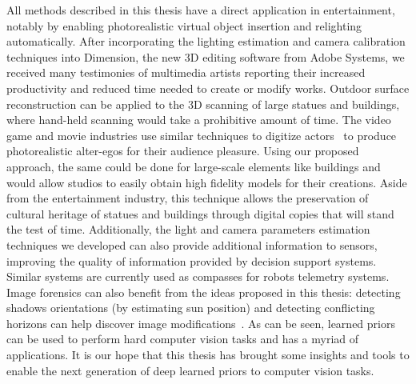 All methods described in this thesis have a direct application in entertainment, notably by enabling photorealistic virtual object insertion and relighting automatically. After incorporating the lighting estimation and camera calibration techniques into Dimension, the new 3D editing software from Adobe Systems, we received many testimonies of multimedia artists reporting their increased productivity and reduced time needed to create or modify works. Outdoor surface reconstruction can be applied to the 3D scanning of large statues and buildings, where hand-held scanning would take a prohibitive amount of time. The video game and movie industries use similar techniques to digitize actors~\cite{debevec2000acquiring} to produce photorealistic alter-egos for their audience pleasure. Using our proposed approach, the same could be done for large-scale elements like buildings and would allow studios to easily obtain high fidelity models for their creations. Aside from the entertainment industry, this technique allows the preservation of cultural heritage of statues and buildings through digital copies that will stand the test of time. Additionally, the light and camera parameters estimation techniques we developed can also provide additional information to sensors, improving the quality of information provided by decision support systems. Similar systems are currently used as compasses for robots telemetry systems\cite{Ma2017}. Image forensics can also benefit from the ideas proposed in this thesis: detecting shadows orientations (by estimating sun position) and detecting conflicting horizons can help discover image modifications~\cite{Farid2010}. As can be seen, learned priors can be used to perform hard computer vision tasks and has a myriad of applications. It is our hope that this thesis has brought some insights and tools to enable the next generation of deep learned priors to computer vision tasks. 
